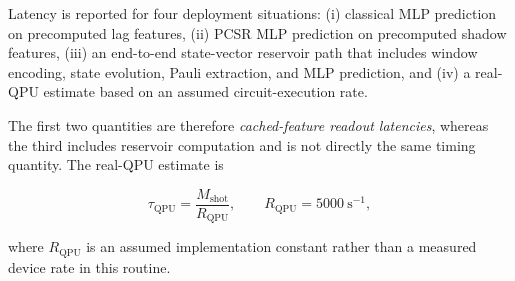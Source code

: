 \documentclass[final,1p,times]{elsarticle}
\begin{document}
Latency is reported for four deployment situations:
(i) classical MLP prediction on precomputed lag features,
(ii) PCSR MLP prediction on precomputed shadow features,
(iii) an end-to-end state-vector reservoir path that includes window
encoding, state evolution, Pauli extraction, and MLP prediction, and
(iv) a real-QPU estimate based on an assumed circuit-execution rate.

The first two quantities are therefore \emph{cached-feature readout
latencies}, whereas the third includes reservoir computation and is not
directly the same timing quantity. The real-QPU estimate is

\begin{equation}
\tau_{\mathrm{QPU}}
=
\frac{M_{\mathrm{shot}}}
{R_{\mathrm{QPU}}},
\qquad
R_{\mathrm{QPU}}=5000~\mathrm{s}^{-1},
\label{eq:qpu_latency}
\end{equation}

where $R_{\mathrm{QPU}}$ is an assumed implementation constant rather
than a measured device rate in this routine.
\end{document}
